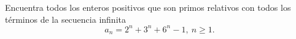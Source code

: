 Encuentra todos los enteros positivos que son primos relativos con todos los términos de la secuencia infinita \[ a_n=2^n+3^n+6^n -1,\ n\geq 1. \]